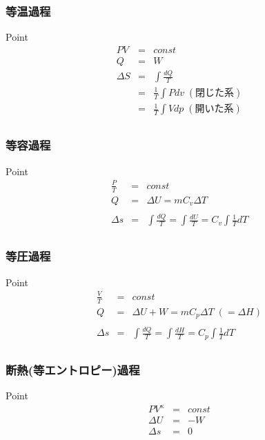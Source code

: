 \documentclass[a4paper]{jsarticle}
\begin{document}
\subsubsection{等温過程}
\begin{itembox}[l]{Point}
    \begin{eqnarray*}
        PV&=&const\\
        Q&=&W\\
        \Delta S
        &=& \int \frac{dQ}{T}\\
        &=& \frac{1}{T}\int Pdv\;(閉じた系)\\
        &=& \frac{1}{T}\int Vdp\;(開いた系)\\
    \end{eqnarray*}
\end{itembox}
\subsubsection{等容過程}
\begin{itembox}[l]{Point}
    \begin{eqnarray*}
        \frac{P}{T}&=&const\\
        Q&=&\Delta U = mC_v\Delta T\\
        \\
        \Delta s&=&\int \frac{dQ}{T} = \int \frac{dU}{T} = C_v\int\frac{1}{T}dT\\
    \end{eqnarray*}
\end{itembox}
\subsubsection{等圧過程}
\begin{itembox}[l]{Point}
    \begin{eqnarray*}
        \frac{V}{T}&=&const\\
        Q&=&\Delta U + W = mC_p\Delta T \; \left(= \Delta H\right)\\
        \\
        \Delta s&=&\int \frac{dQ}{T} = \int \frac{dH}{T} = C_p\int\frac{1}{T}dT\\
    \end{eqnarray*}
\end{itembox}
\subsubsection{断熱(等エントロピー)過程}
\begin{itembox}[l]{Point}
    \begin{eqnarray*}
        PV^\kappa&=&const\\
        \Delta U&=&- W\\
        \Delta s&=&0\\
    \end{eqnarray*}
\end{itembox}
\end{document}
